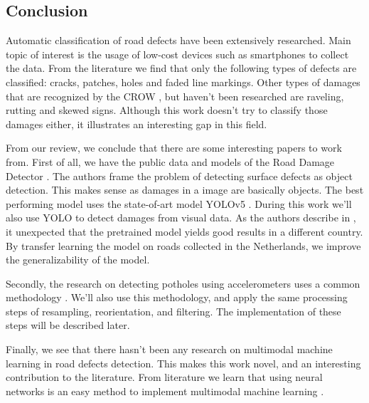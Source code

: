 \subsection{Conclusion}
Automatic classification of road defects have been extensively researched. Main topic of interest is the usage of low-cost devices such as smartphones to collect the data. From the literature we find that only the following types of defects are classified: cracks, patches, holes and faded line markings. Other types of damages that are recognized by the CROW \cite{CROW_147}, but haven't been researched are raveling, rutting and skewed signs. Although this work doesn't try to classify those damages either, it illustrates an interesting gap in this field.

From our review, we conclude that there are some interesting papers to work from. First of all, we have the public data and models of the Road Damage Detector \cite{Arya2020-competition}. The authors frame the problem of detecting surface defects as object detection. This makes sense as damages in a image are basically objects. The best performing model uses the state-of-art model YOLOv5 \cite{rddc2020,Jocher2021}. During this work we'll also use YOLO to detect damages from visual data. As the authors describe in , it unexpected that the pretrained model yields good results in a different country. By transfer learning the model on roads collected in the Netherlands, we improve the generalizability of the model.

Secondly, the research on detecting potholes using accelerometers uses a common methodology \cite{Wu2020,Basavaraju2019}. We'll also use this methodology, and apply the same processing steps of resampling, reorientation, and filtering. The implementation of these steps will be described later. 

Finally, we see that there hasn't been any research on multimodal machine learning in road defects detection. This makes this work novel, and an interesting contribution to the literature. From literature we learn that using neural networks is an easy method to implement multimodal machine learning \cite{Baltrusaitis2017}. 

